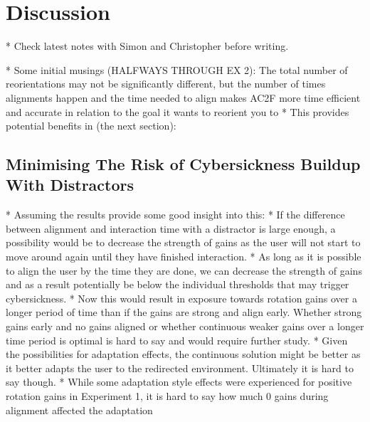 \section{Discussion}
* Check latest notes with Simon and Christopher before writing. 


* Some initial musings (HALFWAYS THROUGH EX 2): The total number of reorientations may not be significantly different, but the number of times alignments happen and the time needed to align makes AC2F more time efficient and accurate in relation to the goal it wants to reorient you to
* This provides potential benefits in (the next section): 

\subsection{Minimising The Risk of Cybersickness Buildup With Distractors}
* Assuming the results provide some good insight into this:
* If the difference between alignment and interaction time with a distractor is large enough, a possibility would be to decrease the strength of gains as the user will not start to move around again until they have finished interaction. 
* As long as it is possible to align the user by the time they are done, we can decrease the strength of gains and as a result potentially be below the individual thresholds that may trigger cybersickness. 
   * Now this would result in exposure towards rotation gains over a longer period of time than if the gains are strong and align early. Whether strong gains early and no gains aligned or whether continuous weaker gains over a longer time period is optimal is hard to say and would require further study.
   * Given the possibilities for adaptation effects, the continuous solution might be better as it better adapts the user to the redirected environment. Ultimately it is hard to say though. 
   * While some adaptation style effects were experienced for positive rotation gains in Experiment 1, it is hard to say how much 0 gains during alignment affected the adaptation

